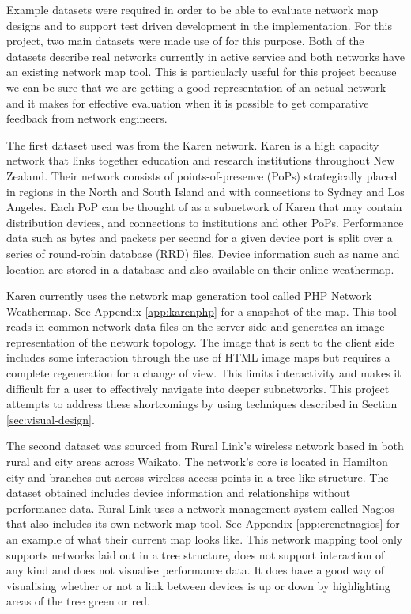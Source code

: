 \documentclass[11pt, a4paper]{article}
\begin{document}
Example datasets were required in order to be able to evaluate network map
designs and to support test driven development in the implementation. For this
project, two main datasets were made use of for this purpose. Both of the
datasets describe real networks currently in active service and both networks
have an existing network map tool. This is particularly useful for this project
because we can be sure that we are getting a good representation of an actual
network and it makes for effective evaluation when it is possible to get
comparative feedback from network engineers. 

The first dataset used was from the Karen network.\cite{Karen_website} Karen is
a high capacity network that links together education and research institutions
throughout New Zealand. Their network consists of points-of-presence (PoPs)
strategically placed in regions in the North and South Island and with
connections to Sydney and Los Angeles. Each PoP can be thought of as a
subnetwork of Karen that may contain distribution devices, and connections to
institutions and other PoPs.  Performance data such as bytes and packets per
second for a given device port is split over a series of round-robin database
(RRD) files. Device information such as name and location are stored in a
database and also available on their online weathermap.

Karen currently uses the network map generation tool called PHP Network
Weathermap.\cite{PHP_Network_Weathermap_website} See Appendix
\ref{app:karenphp} for a snapshot of the map. This tool reads in common network
data files on the server side and generates an image representation of the
network topology. The image that is sent to the client side includes some
interaction through the use of HTML image maps but requires a complete
regeneration for a change of view. This limits interactivity and makes it
difficult for a user to effectively navigate into deeper subnetworks. This
project attempts to address these shortcomings by using techniques described in
Section \ref{sec:visual-design}. 

The second dataset was sourced from Rural Link's wireless network based in both
rural and city areas across Waikato. The network's core is located in Hamilton
city and branches out across wireless access points in a tree like structure.
The dataset obtained includes device information and relationships without
performance data. Rural Link uses a network management system called Nagios that
also includes its own network map tool.\cite{Nagio_website} See Appendix
\ref{app:crcnetnagios} for an example of what their current map looks like. This
network mapping tool only supports networks laid out in a tree structure, does
not support interaction of any kind and does not visualise performance data. It
does have a good way of visualising whether or not a link between devices is up
or down by highlighting areas of the tree green or red. 
\end{document}
